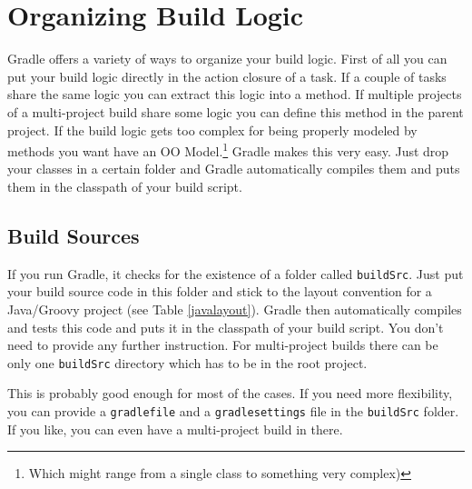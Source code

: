 \chapter{Organizing Build Logic} %
\label{cha:organizing_build_logic}
Gradle offers a variety of ways to organize your build logic. First of all you can put your build logic directly in the action closure of a task. If a couple of tasks share the same logic you can extract this logic into a method. If multiple projects of a multi-project build share some logic you can define this method in the parent project. If the build logic gets too complex for being properly modeled by methods you want have an OO Model.\footnote{Which might range from a single class to something very complex)} Gradle makes this very easy. Just drop your classes in a certain folder and Gradle automatically compiles them and puts them in the classpath of your build script.

\section{Build Sources} %
\label{sec:build_sources}
If you run Gradle, it checks for the existence of a folder called \texttt{buildSrc}. Just put your build source code in this folder and stick to the layout convention for a Java/Groovy project (see Table \ref{javalayout}). Gradle then automatically compiles and tests this code and puts it in the classpath of your build script. You don't need to provide any further instruction. For multi-project builds there can be only one \texttt{buildSrc} directory which has to be in the root project.

This is probably good enough for most of the cases. If you need more flexibility, you can provide a \texttt{gradlefile} and a \texttt{gradlesettings} file in the \texttt{buildSrc} folder. If you like, you can even have a multi-project build in there.

